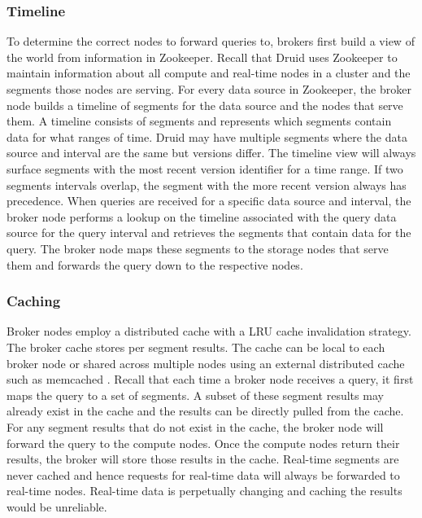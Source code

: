 \documentclass{vldb}
\begin{document}
\subsubsection{Timeline}
To determine the correct nodes to forward queries to, brokers
first build a view of the world from information in Zookeeper. Recall
that Druid uses Zookeeper to maintain information about all compute
and real-time nodes in a cluster and the segments those nodes are
serving. For every data source in Zookeeper, the broker node builds a
timeline of segments for the data source and the nodes that serve them. A timeline
consists of segments and represents which segments contain data for
what ranges of time. Druid may have multiple segments where the data
source and interval are the same but versions differ. The timeline
view will always surface segments with the most recent version
identifier for a time range. If two segments intervals overlap, the segment with the more recent
version always has precedence. When queries are received for a specific
data source and interval, the broker node performs a lookup on the
timeline associated with the query data source for the query interval
and retrieves the segments that contain data for the query. The broker
node maps these segments to the storage nodes that serve them and
forwards the query down to the respective nodes.


\subsubsection{Caching}
\label{sec:caching}
Broker nodes employ a distributed cache with a LRU \cite{o1993lru,
kim2001lrfu} cache invalidation strategy. The broker cache stores
per segment results. The cache can be local to each broker node or
shared across multiple nodes using an external distributed cache
such as memcached \cite{fitzpatrick2004distributed}. Recall that each time a broker node receives a
query, it first maps the query to a set of segments. A subset of
these segment results may already exist in the cache and the results
can be directly pulled from the cache. For any segment results that
do not exist in the cache, the broker node will forward the query
to the compute nodes. Once the compute nodes return their results,
the broker will store those results in the cache. Real-time segments
are never cached and hence requests for real-time data will always
be forwarded to real-time nodes. Real-time data is perpetually
changing and caching the results would be unreliable.
\end{document}
